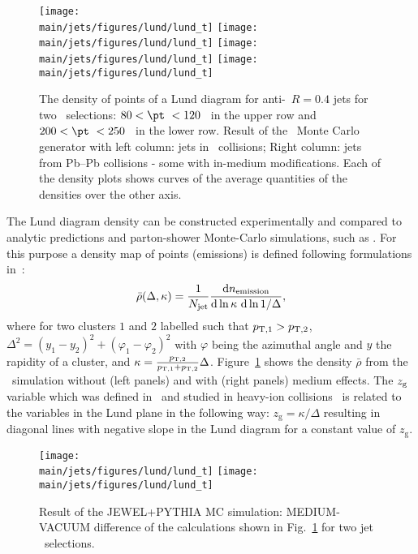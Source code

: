 \begin{figure}[ht]
	\centering
	\texttt{[image: \\main/jets/figures/lund/lund\_t]}
	\texttt{[image: \\main/jets/figures/lund/lund\_t]}
	\texttt{[image: \\main/jets/figures/lund/lund\_t]}
	\texttt{[image: \\main/jets/figures/lund/lund\_t]}
	\caption{The density of points of a Lund diagram for anti-\kT\ $R=0.4$ jets for two \pt\ selections: $80 < \pt\ < 120$ \gevc\ in the upper row and $200 < \pt\ < 250$ \gevc\ in the lower row. Result of the \jewel\ Monte Carlo generator with left column: jets in \pp\ collisions; Right column: jets from Pb--Pb collisions - some with in-medium modifications. Each of the density plots shows curves of the average quantities of the densities over the other axis.}
	\label{fig:Lund_jets}
\end{figure}

The Lund diagram density can be constructed experimentally and compared to analytic predictions and parton-shower Monte-Carlo simulations, such as \jewel. For this purpose a density map of points (emissions) is defined following formulations in~\cite{Dreyer:2018nbf}: 
\begin{equation}
\bar{\rho}(\Delta, \kappa) = \frac{1}{N_{\rm jet}} \frac{\mathrm{d}n_{\rm emission}}{\mathrm{d} \ln \kappa~\mathrm{d} \ln 1/\Delta},
\end{equation}
where for two clusters $1$ and $2$ labelled such that $p_{\rm T,1} > p_{\rm T,2}$, $\Delta^{2} = (y_1 - y_2)^2 + (\varphi_1 - \varphi_2)^2$ with $\varphi$ being the azimuthal angle and $y$ the rapidity of a cluster, and $\kappa=\frac{p_{\rm T,2}}{p_{\rm T,1} + p_{\rm T,2}}\Delta$. Figure~\ref{fig:Lund_jets} shows the density $\bar{\rho}$ from the \jewel\ simulation without (left panels) and with (right panels) medium effects. 
The $z_{\rm g}$ variable which was defined in~\cite{Larkoski:2015lea} and studied in heavy-ion collisions~\cite{Sirunyan:2017bsd} is related to the variables in the Lund plane in the following way: $z_{\mathrm{g}} = \kappa/\Delta$ resulting in diagonal lines with negative slope in the Lund diagram for a constant value of $z_\mathrm{g}$.
%
\begin{figure}[htbp]
	\centering
	\texttt{[image: \\main/jets/figures/lund/lund\_t]}
	\texttt{[image: \\main/jets/figures/lund/lund\_t]}
	\caption{Result of the JEWEL+PYTHIA MC simulation: MEDIUM-VACUUM difference of the calculations shown in Fig.~\ref{fig:Lund_jets} for two jet \pt\ selections.}
	\label{fig:Lund_jets_vac_med}
\end{figure}

